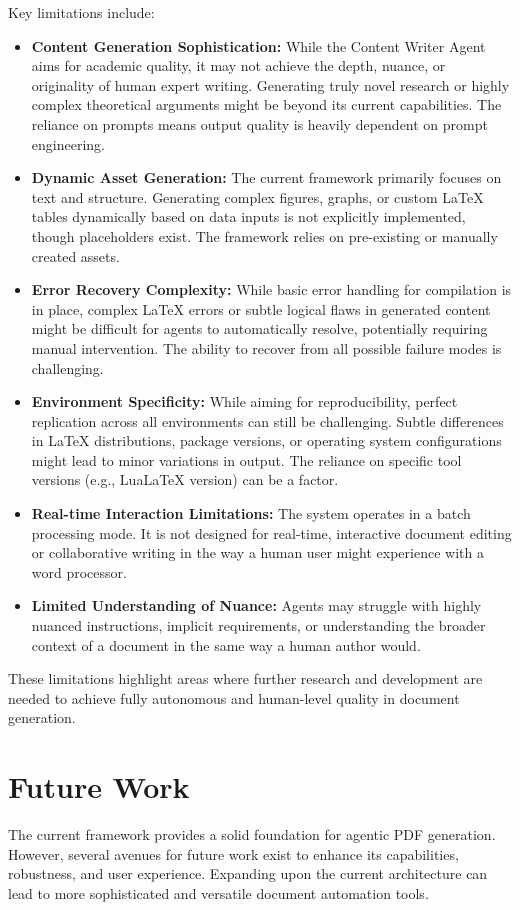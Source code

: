 \documentclass{custom-academic-template}
\begin{document}
Key limitations include:
\begin{itemize}
    \item 	\textbf{Content Generation Sophistication:} While the Content Writer Agent aims for academic quality, it may not achieve the depth, nuance, or originality of human expert writing. Generating truly novel research or highly complex theoretical arguments might be beyond its current capabilities. The reliance on prompts means output quality is heavily dependent on prompt engineering.
    \item 	\textbf{Dynamic Asset Generation:} The current framework primarily focuses on text and structure. Generating complex figures, graphs, or custom LaTeX tables dynamically based on data inputs is not explicitly implemented, though placeholders exist. The framework relies on pre-existing or manually created assets.
    \item 	\textbf{Error Recovery Complexity:} While basic error handling for compilation is in place, complex LaTeX errors or subtle logical flaws in generated content might be difficult for agents to automatically resolve, potentially requiring manual intervention. The ability to recover from all possible failure modes is challenging.
    \item 	\textbf{Environment Specificity:} While aiming for reproducibility, perfect replication across all environments can still be challenging. Subtle differences in LaTeX distributions, package versions, or operating system configurations might lead to minor variations in output. The reliance on specific tool versions (e.g., LuaLaTeX version) can be a factor.
    \item 	\textbf{Real-time Interaction Limitations:} The system operates in a batch processing mode. It is not designed for real-time, interactive document editing or collaborative writing in the way a human user might experience with a word processor.
    \item 	\textbf{Limited Understanding of Nuance:} Agents may struggle with highly nuanced instructions, implicit requirements, or understanding the broader context of a document in the same way a human author would.
\end{itemize}
These limitations highlight areas where further research and development are needed to achieve fully autonomous and human-level quality in document generation.

\section{Future Work}
The current framework provides a solid foundation for agentic PDF generation. However, several avenues for future work exist to enhance its capabilities, robustness, and user experience. Expanding upon the current architecture can lead to more sophisticated and versatile document automation tools.
\end{document}
